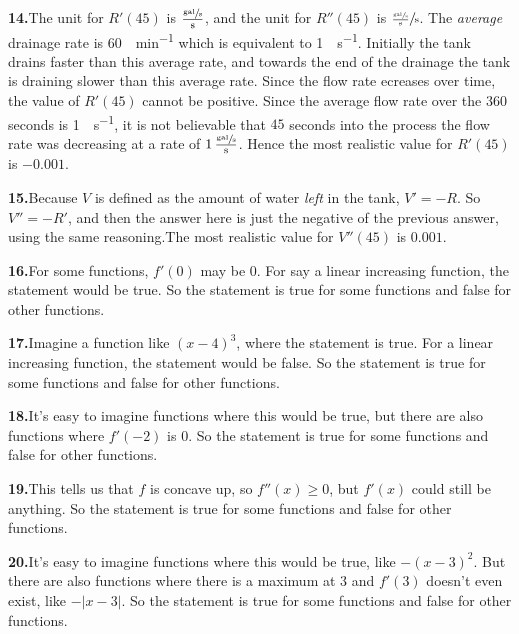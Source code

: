 \documentclass[10pt,oneside,]{book}
\theoremstyle{plain}
\theoremstyle{definition}
\numberwithin{equation}{section}
\newcommand{\fe}[2]{#1\mathopen{}\left(#2\right)\mathclose{}}
\newcommand{\fd}[1]{#1'}
\newcommand{\sd}[1]{#1''}
\begin{document}
\par\smallskip
\noindent\textbf{14.}\quad{}The unit for \(\fe{\fd{R}}{45}\) is \(\frac{\sfrac{\text{gal}}{\text{s}}}{\text{s}}\), and the unit for \(\fe{\sd{R}}{45}\) is \(\sfrac{\frac{\sfrac{\text{gal}}{\text{s}}}{\text{s}}}{\text{s}}\). The \emph{average} drainage rate is \SI{60}{\gallon\per\minute} which is equivalent to \SI{1}{\gallon\per\second}. Initially the tank drains faster than this average rate, and towards the end of the drainage the tank is draining slower than this average rate.  Since the flow rate ecreases over time, the value of \(\fe{\fd{R}}{45}\) cannot be positive. Since the average flow rate over the \(360\) seconds is \SI{1}{\gallon\per\second}, it is not believable that \(45\) seconds into the process the flow rate was decreasing at a rate of \(1\,\frac{\sfrac{\text{gal}}{\text{s}}}{\text{s}}\).   Hence the most realistic value for \(\fe{\fd{R}}{45}\) is \(-0.001\).%
\par\smallskip
\noindent\textbf{15.}\quad{}Because \(V\) is defined as the amount of water \emph{left} in the tank, \(\fd{V}=-R\). So \(\sd{V}=-\fd{R}\), and then the answer here is just the negative of the previous answer, using the same reasoning.The most realistic value for \(\fe{\sd{V}}{45}\) is \(0.001\).%
\par\smallskip
\noindent\textbf{16.}\quad{}For some functions, \(\fe{\fd{f}}{0}\) may be \(0\). For say a linear increasing function, the statement would be true. So the statement is true for some functions and false for other functions.%
\par\smallskip
\noindent\textbf{17.}\quad{}Imagine a function like \((x-4)^3\), where the statement is true. For a linear increasing function, the statement would be false. So the statement is true for some functions and false for other functions.%
\par\smallskip
\noindent\textbf{18.}\quad{}It's easy to imagine functions where this would be true, but there are also functions where \(\fe{\fd{f}}{-2}\) is \(0\). So the statement is true for some functions and false for other functions.%
\par\smallskip
\noindent\textbf{19.}\quad{}This tells us that \(f\) is concave up, so \(\fe{\sd{f}}{x}\geq0\), but \(\fe{\fd{f}}{x}\) could still be anything. So the statement is true for some functions and false for other functions.%
\par\smallskip
\noindent\textbf{20.}\quad{}It's easy to imagine functions where this would be true, like \(-(x-3)^2\). But there are also functions where there is a maximum at \(3\) and \(\fe{\fd{f}}{3}\) doesn't even exist, like \(-|x-3|\). So the statement is true for some functions and false for other functions.%
\end{document}
